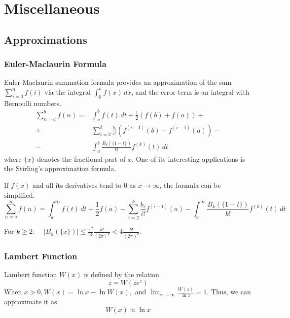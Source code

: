 \chapter{Miscellaneous}

\section{Approximations}

\subsection{Euler-Maclaurin Formula}

Euler-Maclaurin summation formula provides an approximation of the sum $\sum_{i=0}^n{f(i)}$
via the integral $\int_0^n{f(x)\,dx}$, and the error term is an integral with Bernoulli numbers.
\begin{equation}
    \label{eq:euler-maclaurin-formula}
    \begin{split}
        \sum_{n=a}^b{f(n)}=&\int_a^b{f(t)\,dt}+\frac{1}{2}(f(b)+f(a))+\\
        +&\sum_{i=2}^k{\frac{b_i}{i!}\left(f^{(i-1)}(b)-f^{(i-1)}(a)\right)}-\\
        -&\int_a^b{\frac{B_k(\{1-t\})}{k!}f^{(k)}(t)\,dt}
    \end{split}
\end{equation}
where $\{x\}$ denotes the fractional part of $x$.
One of its interesting applications is the Stirling's approximation formula.

If $f(x)$ and all its derivatives tend to $0$ as $x\to\infty$, the formula can be simplified.
\begin{equation}
    \sum_{n=a}^\infty{f(n)}=\int_a^\infty{f(t)\,dt}+\frac{1}{2}f(a)
    -\sum_{i=2}^k{\frac{b_i}{i!}f^{(i-1)}(a)}
    -\int_a^\infty{\frac{B_k(\{1-t\})}{k!}f^{(k)}(t)\,dt}
\end{equation}

For $k\geq2$: $\quad|B_k(\{x\})|\leq\frac{\pi^2}{3}\frac{k!}{(2\pi)^k}<4\frac{k!}{(2\pi)^k}$.

\subsection{Lambert Function}

Lambert function $W(x)$ is defined by the relation
\begin{equation}
    z=W(ze^z)
\end{equation}
When $x>0, W(x)=\ln x-\ln W(x),$ and $\lim_{x\to\infty}{\frac{W(x)}{\ln x}}=1$.
Thus, we can approximate it as
\begin{equation}
    \label{eq:lambert-approx}
    W(x)\approx\ln x
\end{equation}

